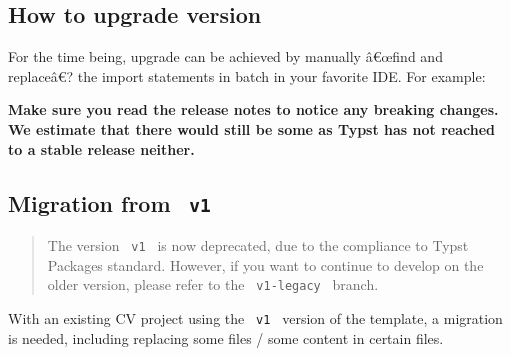 \subsection{How to upgrade version}\label{how-to-upgrade-version}

For the time being, upgrade can be achieved by manually â€œfind and
replaceâ€? the import statements in batch in your favorite IDE. For
example:

\begin{Shaded}
\begin{Highlighting}[]
\end{Highlighting}
\end{Shaded}

\textbf{Make sure you read the release notes to notice any breaking
changes. We estimate that there would still be some as Typst has not
reached to a stable release neither.}

\subsection{\texorpdfstring{Migration from
\texttt{\ v1\ }}{Migration from  v1 }}\label{migration-from-v1}

\begin{quote}
The version \texttt{\ v1\ } is now deprecated, due to the compliance to
Typst Packages standard. However, if you want to continue to develop on
the older version, please refer to the \texttt{\ v1-legacy\ } branch.
\end{quote}

With an existing CV project using the \texttt{\ v1\ } version of the
template, a migration is needed, including replacing some files / some
content in certain files.

